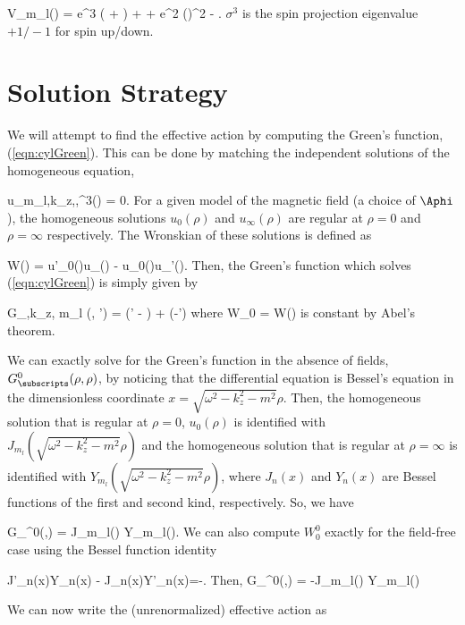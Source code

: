 \be 
\label{eqn:effPot}
V_{m_l}(\rho) = e\sigma^{3} \left(\frac{\Aphi}{\rho}  + 
	\right) + +
	e^2 (\Aphi)^2 -  \Aphi.
\ee 
$\sigma^3$ is the spin projection eigenvalue $+1/-1$ for spin up/down.

\section{Solution Strategy}



We will attempt to find the effective action by computing the Green's function, 
(\ref{eqn:cylGreen}).  This can be done by
matching the independent solutions of the homogeneous equation,

\be
{}u_{m_l,k_z,\omega,\sigma^3}(\rho) 
	= 0.
\ee
For a given model of the magnetic field (a choice of $\Aphi$), 
the homogeneous solutions $u_0(\rho)$ and $u_\infty(\rho)$ are regular at $\rho =0$
and $\rho=\infty$ respectively.  The Wronskian of these solutions is defined as

\be 
W(\rho) = u'_0(\rho)u_\infty(\rho) - u_0(\rho)u_\infty'(\rho).
\ee 
Then, the Green's function which solves (\ref{eqn:cylGreen}) is simply given by

\be 
G_{\omega,k_z, m_l} (\rho, \rho') = \theta(\rho' - \rho)  + 
	\theta(\rho-\rho')
\ee 
where
\be 
W_0 = \rho W(\rho)
\ee 
is constant by Abel's theorem.

\begin{sloppypar}
We can exactly solve for the Green's function in the 
absence of fields, $G_{\subscripts}^0(\rho,\rho)$,
 by noticing that the 
differential equation is Bessel's equation in the dimensionless 
coordinate $x=\sqrt{\omega^2-k_z^2 -m^2}\rho$.
Then, the homogeneous solution that is regular at $\rho=0$, $u_0(\rho)$ is identified 
with $J_{m_l}(\sqrt{\omega^2-k_z^2-m^2}\rho)$ and the homogeneous solution 
that is regular at $\rho=\infty$ is identified with $Y_{m_l}(\sqrt{\omega^2-k_z^2-m^2}\rho)$, 
where $J_n(x)$ and $Y_n(x)$ are Bessel functions of the first and second kind,
respectively.
So, we have

\be 
G_{\subscripts}^0(\rho,\rho) = J_{m_l}(\rho)
	Y_{m_l}(\rho).
\ee 
We can also compute
$W_0^0$ exactly for the field-free case using the Bessel function identity

\be 
\label{eqn:BessID}
J'_n(x)Y_n(x) - J_n(x)Y'_n(x)=-.
\ee 
Then,
\be 
\label{eqn:BkgGreens}
G_{\subscripts}^0(\rho,\rho) = -J_{m_l}(\rho)
	Y_{m_l}(\rho)
\ee 
\end{sloppypar}
We can now write the (unrenormalized) effective action as

